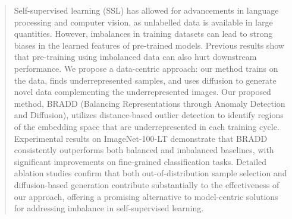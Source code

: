 
\begin{abstract}
Self-supervised learning (SSL) has allowed for advancements in language processing and computer vision, as unlabelled data is available in large quantities. However, imbalances in training datasets can lead to strong biases in the learned features of pre-trained models. Previous results show that pre-training using imbalanced data can also hurt downstream performance. We propose a data-centric approach: our method trains on the data, finds underrepresented samples, and uses diffusion to generate novel data complementing the underrepresented images. Our proposed method, BRADD (Balancing Representations through Anomaly Detection and Diffusion), utilizes distance-based outlier detection to identify regions of the embedding space that are underrepresented in each training cycle. Experimental results on ImageNet-100-LT demonstrate that BRADD consistently outperforms both balanced and imbalanced baselines, with significant improvements on fine-grained classification tasks. Detailed ablation studies confirm that both out-of-distribution sample selection and diffusion-based generation contribute substantially to the effectiveness of our approach, offering a promising alternative to model-centric solutions for addressing imbalance in self-supervised learning.
\end{abstract}